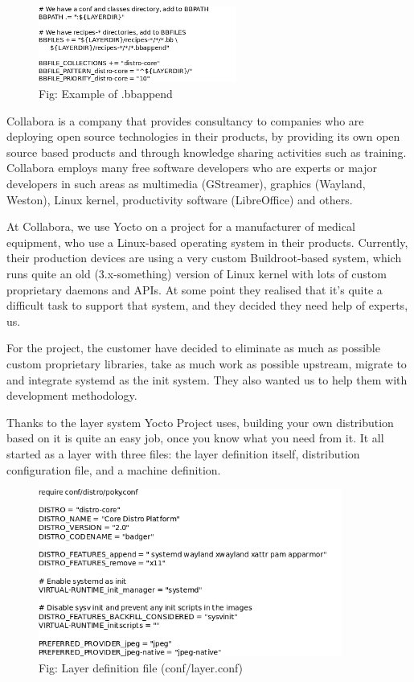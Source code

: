 \documentclass[10pt, a5paper]{article}
\begin{document}
\begin{figure}[H]
  \centering
  \includegraphics[height=2.5cm]{w_07_2016_Shadura5.png}
  \caption* {Fig: Example of .bbappend}
\end{figure}


Collabora is a company that provides consultancy to companies who are deploying open source technologies in their products, by providing its own open source based products and through knowledge sharing activities such as training. Collabora employs many free software \linebreak developers who are experts or major developers in such areas as \linebreak multimedia (GStreamer), graphics (Wayland, Weston), Linux kernel, productivity software (LibreOffice) and others.

At Collabora, we use Yocto on a project for a manufacturer of medical equipment, who use a Linux-based operating system in their products. Currently, their production devices are using a very custom Buildroot-based system, which runs quite an old (3.x-something) version of Linux kernel with lots of custom proprietary daemons and APIs. At some point they realised that it's quite a difficult task to support that system, and they decided they need help of experts, us.

For the project, the customer have decided to eliminate as much as possible custom proprietary libraries, take as much work as possible upstream, migrate to and integrate systemd as the init system. They also wanted us to help them with development methodology.

Thanks to the layer system Yocto Project uses, building your own distribution based on it is quite an easy job, once you know what you need from it. It all started as a layer with three files: the layer definition itself, distribution configuration file, and a machine definition.

\begin{figure}[h!]
  \centering
  \includegraphics[height=5.5cm]{w_07_2016_Shadura6.png}
  \caption* {Fig: Layer definition file (conf/layer.conf)}

\end{figure}
\end{document}

